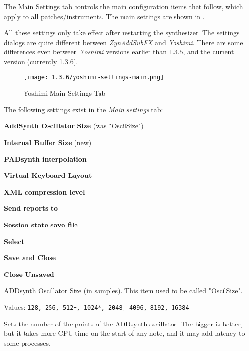    The Main Settings tab controls the main configuration items that
   follow, which apply to all patches/instruments.
   The main settings are shown in
   .

   All these settings only take effect after restarting the synthesizer.
   The settings dialogs are quite different between \textsl{ZynAddSubFX} and
   \textsl{Yoshimi}.  There are some differences even between
   \textsl{Yoshimi} versions earlier than 1.3.5, and the current version
   (currently 1.3.6).

\begin{figure}[H]
   \centering 
   \texttt{[image: 1.3.6/yoshimi-settings-main.png]}
   \caption{Yoshimi Main Settings Tab}
   \label{fig:yoshimi_main_settings_dialog}
\end{figure}

   The following settings exist in the \textsl{Main settings} tab:

   \begin{enumber}
      \item \textbf{AddSynth Oscillator Size} (was "OscilSize")
      \item \textbf{Internal Buffer Size} (new)
      \item \textbf{PADsynth interpolation}
      \item \textbf{Virtual Keyboard Layout}
      \item \textbf{XML compression level}
      \item \textbf{Send reports to}
      \item \textbf{Session state save file}
      \item \textbf{Select}
      \item \textbf{Save and Close}
      \item \textbf{Close Unsaved}
   \end{enumber}

   \setcounter{ItemCounter}{0}      %

   ADDsynth Oscillator Size (in samples).  This item used to be called
   "OscilSize".

   Values: \texttt{128, 256, 512+, 1024*, 2048, 4096, 8192, 16384}

   Sets the number of the points of the ADDsynth oscillator. The
   bigger is better, but it takes more CPU time on the start of any note,
   and it may add latency to some processes.

